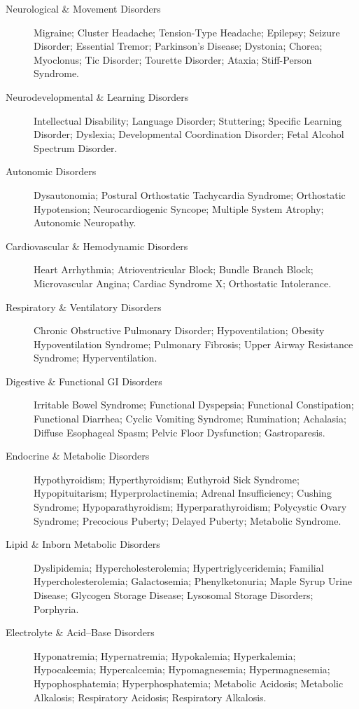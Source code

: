 \begin{description}
\item[Neurological \& Movement Disorders] Migraine; Cluster Headache; Tension-Type Headache; Epilepsy; Seizure Disorder; Essential Tremor; Parkinson's Disease; Dystonia; Chorea; Myoclonus; Tic Disorder; Tourette Disorder; Ataxia; Stiff-Person Syndrome.

\item[Neurodevelopmental \& Learning Disorders] Intellectual Disability; Language Disorder; Stuttering; Specific Learning Disorder; Dyslexia; Developmental Coordination Disorder; Fetal Alcohol Spectrum Disorder.

\item[Autonomic Disorders] Dysautonomia; Postural Orthostatic Tachycardia Syndrome; Orthostatic Hypotension; Neurocardiogenic Syncope; Multiple System Atrophy; Autonomic Neuropathy.

\item[Cardiovascular \& Hemodynamic Disorders] Heart Arrhythmia; Atrioventricular Block; Bundle Branch Block; Microvascular Angina; Cardiac Syndrome X; Orthostatic Intolerance.

\item[Respiratory \& Ventilatory Disorders] Chronic Obstructive Pulmonary Disorder; Hypoventilation; Obesity Hypoventilation Syndrome; Pulmonary Fibrosis; Upper Airway Resistance Syndrome; Hyperventilation.

\item[Digestive \& Functional GI Disorders] Irritable Bowel Syndrome; Functional Dyspepsia; Functional Constipation; Functional Diarrhea; Cyclic Vomiting Syndrome; Rumination; Achalasia; Diffuse Esophageal Spasm; Pelvic Floor Dysfunction; Gastroparesis.

\item[Endocrine \& Metabolic Disorders] Hypothyroidism; Hyperthyroidism; Euthyroid Sick Syndrome; Hypopituitarism; Hyperprolactinemia; Adrenal Insufficiency; Cushing Syndrome; Hypoparathyroidism; Hyperparathyroidism; Polycystic Ovary Syndrome; Precocious Puberty; Delayed Puberty; Metabolic Syndrome.

\item[Lipid \& Inborn Metabolic Disorders] Dyslipidemia; Hypercholesterolemia; Hypertriglyceridemia; Familial Hypercholesterolemia; Galactosemia; Phenylketonuria; Maple Syrup Urine Disease; Glycogen Storage Disease; Lysosomal Storage Disorders; Porphyria.

\item[Electrolyte \& Acid–Base Disorders] Hyponatremia; Hypernatremia; Hypokalemia; Hyperkalemia; Hypocalcemia; Hypercalcemia; Hypomagnesemia; Hypermagnesemia; Hypophosphatemia; Hyperphosphatemia; Metabolic Acidosis; Metabolic Alkalosis; Respiratory Acidosis; Respiratory Alkalosis.


\end{description}
